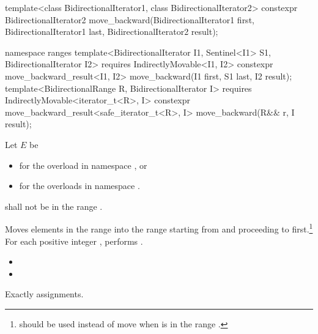 %
\begin{itemdecl}
template<class BidirectionalIterator1, class BidirectionalIterator2>
  constexpr BidirectionalIterator2
    move_backward(BidirectionalIterator1 first, BidirectionalIterator1 last,
                  BidirectionalIterator2 result);
\end{itemdecl}
\begin{addedblock}
\begin{itemdecl}
namespace ranges {
  template<BidirectionalIterator I1, Sentinel<I1> S1, BidirectionalIterator I2>
    requires IndirectlyMovable<I1, I2>
    constexpr move_backward_result<I1, I2>
      move_backward(I1 first, S1 last, I2 result);
  template<BidirectionalRange R, BidirectionalIterator I>
    requires IndirectlyMovable<iterator_t<R>, I>
    constexpr move_backward_result<safe_iterator_t<R>, I>
      move_backward(R&& r, I result);
}
\end{itemdecl}
\end{addedblock}

\begin{itemdescr}
\begin{addedblock}
\pnum
Let $E$ be
\begin{itemize}
\item {} for the overload in namespace , or
\item {} for the overloads in namespace .
\end{itemize}
\end{addedblock}

\pnum
\requires
{}
shall not be in the range
.

\pnum
\effects
Moves elements in the range 
into the
range 
starting from
and proceeding to first.\footnote{
should be used instead of move when 
is in
the range
.}
For each positive integer
,
performs
.

\pnum
\returns
\begin{itemize}
\item {} 
\item {}
\end{itemize}

\pnum
\complexity
Exactly
assignments.
\end{itemdescr}


